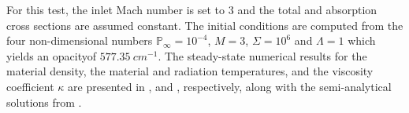\documentclass[times,doublespace]{fldauth}%
\begin{document}
%
For this test, the inlet Mach number is set to $3$ and the total and absorption cross sections are assumed constant. The initial conditions are computed from the four non-dimensional numbers $\mathbb{P}_\infty=10^{-4}$, $M=3$, $\mathbb{\Sigma}=10^6$ and $\mathbb{\Lambda}=1$ which yields an opacityof $577.35 \ cm^{-1}$. The steady-state numerical results for the material density, the material and radiation temperatures, and the viscosity coefficient $\kappa$ are presented in ,  and , respectively, along with the semi-analytical solutions from \cite{ferguson}.
\end{document}
